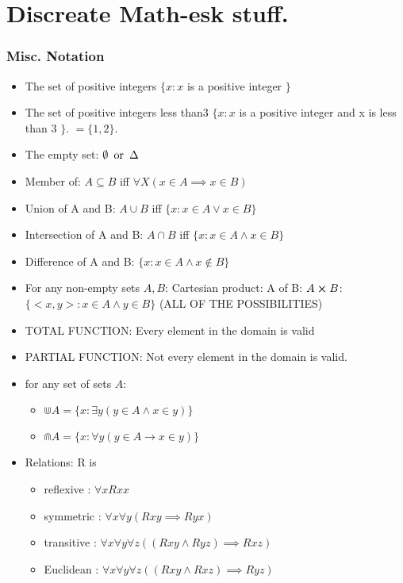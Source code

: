 
\chapter{Discreate Math-esk stuff.}
\subsection{Misc. Notation}

\begin{itemize}
\item The set of positive integers $\{ x : x$ is a positive integer $\}$ 
\item The set of positive integers less than3 $\{ x : x $ is a positive integer and x is less than 3 $\}$. $= \{1,2\}$. 
\item The empty set: $\emptyset \operatorname{\text{ or }} \Delta$ 
\item Member of: $A \subseteq B$ iff $\forall X (x \in A \implies x \in B )$ 
\item Union of A and B: $A \cup B $ iff $\{ x : x \in A \lor x \in B \}$
\item Intersection of A and B: $A \cap B $ iff $\{ x : x \in A \land x \in B \}$
\item Difference of A and B: $\{ x : x \in A \land x \not \in B \}$
\item For any non-empty sets $A,B$:
Cartesian product: A of B: $A \cross B$: $\{<x,y>: x \in A \land y \in B \}$ (ALL OF THE POSSIBILITIES)
\item TOTAL FUNCTION: Every element in the domain is valid
\item PARTIAL FUNCTION: Not every element in the domain is valid.
\item for any set of sets $A$:
\begin{itemize}
\item $\Cup A = \{ x : \exists y ( y \in A \land x \in y ) \}$ 
\item $\Cap A = \{ x : \forall y (y \in A \to x \in y )\}$ 
\end{itemize}
\item Relations: R is 
\begin{itemize}
\item reflexive : $\forall x Rxx$
\item symmetric : $\forall x \forall y (Rxy \implies Ryx)$
\item transitive : $\forall x \forall y \forall z ((Rxy \land Ryz) \implies Rxz)$
\item Euclidean : $\forall x \forall y \forall z ((Rxy \land Rxz ) \implies Ryz)$

\end{itemize}
\end{itemize}
